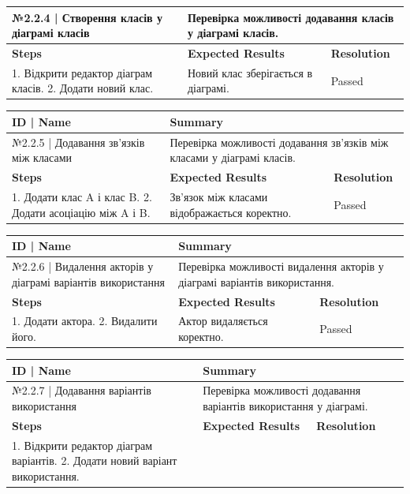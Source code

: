 \documentclass[oneside,14pt]{extarticle}
\begin{document}
\begin{normalsize}
\begin{longtable}{|p{7cm}|p{3.5cm}|p{3.5cm}|}
		\\\hline №2.2.4 | Створення класів у діаграмі
		класів & \multicolumn{2}{|p{7cm}|}{Перевірка можливості додавання класів у
			діаграмі класів.} \\ \hline \textbf{Steps} & \textbf{Expected Results} & \textbf{Resolution} \\ \hline1. Відкрити редактор діаграм класів. 2. Додати
		новий клас. & Новий клас зберігається в діаграмі. & Passed \\ \hline \end{longtable}
		\begin{longtable}{|p{7cm}|p{3.5cm}|p{3.5cm}|} 
		\hline \textbf{ID | Name} &\multicolumn{2}{|p{7cm}|}{\textbf{Summary}} 
		\\\hline №2.2.5 |
		Додавання зв’язків між класами &
		\multicolumn{2}{|p{7cm}|}{Перевірка можливості додавання зв’язків між класами
			у діаграмі класів.}
		\\ \hline \textbf{Steps} & \textbf{Expected Results} & \textbf{Resolution} \\ \hline1. Додати клас A і клас B. 2. Додати асоціацію між A і B. & Зв’язок
		між класами відображається коректно. & Passed \\ \hline \end{longtable}
		\begin{longtable}{|p{7cm}|p{3.5cm}|p{3.5cm}|} 
		\hline \textbf{ID | Name} &\multicolumn{2}{|p{7cm}|}{\textbf{Summary}} 
		\\\hline №2.2.6 | Видалення акторів
		у діаграмі варіантів використання & \multicolumn{2}{|p{7cm}|}{Перевірка
			можливості видалення акторів у діаграмі варіантів використання.} \\ \hline \textbf{Steps} & \textbf{Expected Results} & \textbf{Resolution} \\ \hline1. Додати
		актора. 2. Видалити його. & Актор видаляється коректно. & Passed \\ \hline \end{longtable}
		\begin{longtable}{|p{7cm}|p{3.5cm}|p{3.5cm}|} 
		\hline \textbf{ID | Name} &\multicolumn{2}{|p{7cm}|}{\textbf{Summary}} 
		\\\hline №2.2.7
		| Додавання варіантів використання &
		\multicolumn{2}{|p{7cm}|}{Перевірка можливості додавання варіантів
			використання у діаграмі.}
		\\ \hline \textbf{Steps} & \textbf{Expected Results} & \textbf{Resolution} \\ \hline1. Відкрити редактор діаграм варіантів. 2. Додати новий варіант використання.

\end{longtable}
\end{normalsize}
\end{document}
